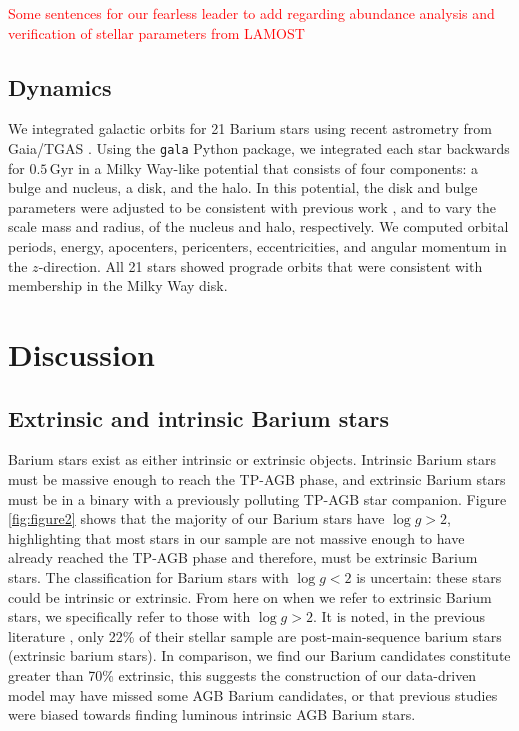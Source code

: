 \documentclass[a4paper,fleqn,usenatbib]{mnras}
\newcommand{\todo}[1]{\textcolor{red}{#1}}
\begin{document}
\todo{Some sentences for our fearless leader to add regarding abundance analysis and verification of stellar parameters from LAMOST}


\subsection{Dynamics}
We integrated galactic orbits for 21 Barium stars using recent astrometry from Gaia/TGAS \citep{gaia2016a,gaia2016b}. Using the \texttt{gala} Python package, we integrated each star backwards for $0.5\,\textrm{Gyr}$ in a Milky Way-like potential that consists of four components: a \citet{hernquist1990} bulge and nucleus, a \citet{miyamoto1975} disk, and the \citet{nfw1997} halo. In this potential, the disk and bulge parameters were adjusted to be consistent with previous work \citep{bovy2015}, and to vary the scale mass and radius, of the nucleus and halo, respectively. We computed orbital periods, energy, apocenters, pericenters, eccentricities, and angular momentum in the $z$-direction. All 21 stars showed prograde orbits that were consistent with membership in the Milky Way disk.

\section{Discussion}  \label{sec:dis}


\subsection{Extrinsic and intrinsic Barium stars}
Barium stars exist as either intrinsic or extrinsic objects. Intrinsic Barium stars must be massive enough to reach the TP-AGB phase, and extrinsic Barium stars must be in a binary with a previously polluting TP-AGB star companion. Figure \ref{fig:figure2} shows that the majority of our Barium stars have $\log{g} > 2$, highlighting that most stars in our sample are not massive enough to have already reached the TP-AGB phase and therefore, must be extrinsic Barium stars. The classification for Barium stars with $\log{g} < 2$ is uncertain: these stars could be intrinsic or extrinsic. From here on when we refer to extrinsic Barium stars, we specifically refer to those with $\log{g} > 2$. It is noted, in the previous literature \citet{van2017}, only 22\% of their stellar sample are post-main-sequence barium stars (extrinsic barium stars). In comparison, we find our Barium candidates constitute greater than 70\% extrinsic, this suggests the construction of our data-driven model may have missed some AGB Barium candidates, or that previous studies were biased towards finding luminous intrinsic AGB Barium stars.
\end{document}
